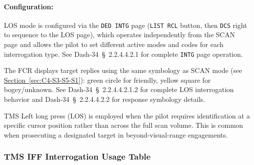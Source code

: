 \documentclass[11pt, a4paper, twoside]{report}
\newcommand{\dashref}[1]{Dash-34~\S~#1}
\newcommand{\secref}[1]{\hyperref[#1]{Section~\ref*{#1}}}
\begin{document}
\paragraph{Configuration:} LOS mode is configured via the \texttt{DED INTG} page (\texttt{LIST RCL} button, then \texttt{DCS} right to sequence to the LOS page), which operates independently from the SCAN page and allows the pilot to set different active modes and codes for each interrogation type. See \dashref{2.2.4.4.2.1} for complete \texttt{INTG} page operation.

The FCR displays target replies using the same symbology as SCAN mode (see \secref{sec:C4-S3-S5-S1}): green circle for friendly, yellow square for bogey/unknown. See \dashref{2.2.4.4.2.1.2} for complete LOS interrogation behavior and \dashref{2.2.4.4.2.2} for response symbology details.

TMS Left long press (LOS) is employed when the pilot requires identification at a specific cursor position rather than across the full scan volume. This is common when prosecuting a designated target in beyond-visual-range engagements.

\subsubsection{TMS IFF Interrogation Usage Table}
\label{sec:C4-S3-S5-S3}


\end{document}
